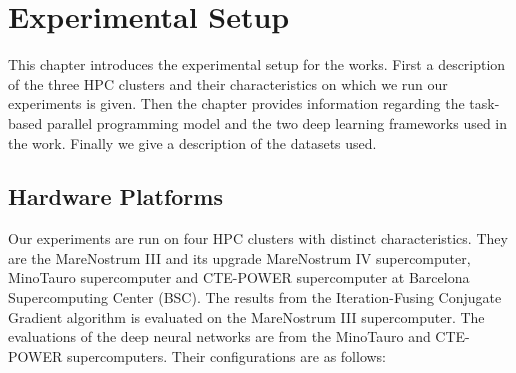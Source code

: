 \chapter{Experimental Setup}
\label{chap:methodology}
This chapter introduces the experimental setup for the works. 
First a description of the three HPC clusters and their characteristics 
on which we run our experiments is given.
Then the chapter provides information regarding the task-based parallel 
programming model and the two deep learning frameworks used in the work.
Finally we give a description of the datasets used.

\section{Hardware Platforms} 
Our experiments are run on four HPC clusters with distinct characteristics.  
They are the MareNostrum III and its upgrade MareNostrum IV supercomputer, 
MinoTauro supercomputer and CTE-POWER supercomputer at Barcelona Supercomputing 
Center (BSC). The results from the Iteration-Fusing Conjugate Gradient algorithm 
is evaluated on the MareNostrum III supercomputer. The evaluations of the deep 
neural networks are from the MinoTauro and CTE-POWER supercomputers. Their 
configurations are as follows:
